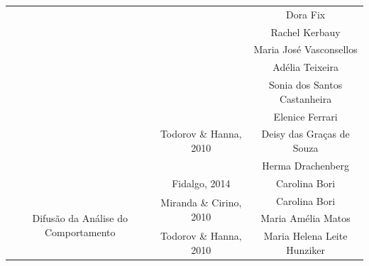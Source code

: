 \begin{table}[]
\begin{adjustbox}{max width=1\textwidth}
\begin{tabular}{@{}ccc@{}}
\multicolumn{1}{c|}{}                                                      & \multicolumn{1}{c|}{}                                         & Dora Fix                                    \\
\multicolumn{1}{c|}{}                                                      & \multicolumn{1}{c|}{}                                         & Rachel Kerbauy                              \\
\multicolumn{1}{c|}{}                                                      & \multicolumn{1}{c|}{}                                         & Maria José Vasconsellos                     \\
\multicolumn{1}{c|}{}                                                      & \multicolumn{1}{c|}{}                                         & Adélia Teixeira                             \\
\multicolumn{1}{c|}{}                                                      & \multicolumn{1}{c|}{}                                         & Sonia dos Santos Castanheira                \\ \cmidrule(l){2-3} 
\multicolumn{1}{c|}{}                                                      & \multicolumn{1}{c|}{\multirow{3}{*}{Todorov \& Hanna, 2010}}  & Elenice Ferrari                             \\
\multicolumn{1}{c|}{}                                                      & \multicolumn{1}{c|}{}                                         & Deisy das Graças de Souza                   \\
\multicolumn{1}{c|}{}                                                      & \multicolumn{1}{c|}{}                                         & Herma Drachenberg                           \\ \cmidrule(l){2-3} 
\multicolumn{1}{c|}{}                                                      & \multicolumn{1}{c|}{Fidalgo, 2014}                            & Carolina Bori                               \\ \midrule
\multicolumn{1}{c|}{\multirow{16}{*}{Difusão da Análise do Comportamento}} & \multicolumn{1}{c|}{\multirow{2}{*}{Miranda \& Cirino, 2010}} & Carolina Bori                               \\
\multicolumn{1}{c|}{}                                                      & \multicolumn{1}{c|}{}                                         & Maria Amélia Matos                          \\ \cmidrule(l){2-3} 
\multicolumn{1}{c|}{}                                                      & \multicolumn{1}{c|}{Todorov \& Hanna, 2010}                   & Maria Helena Leite Hunziker                 \\ \cmidrule(l){2-3} 

\end{tabular}
\end{adjustbox}
\end{table}
